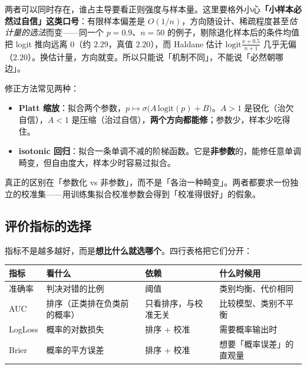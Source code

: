 \documentclass[11pt,a4paper,fontset=windows,zihao=-4]{ctexart}
\newcommand{\tabhead}{\sffamily\bfseries\color{navy}}
\begin{document}
两者可以同时存在，谁占主导要看正则强度与样本量。这里要格外小心\textbf{「小样本必然过自信」这类口号}：有限样本偏差是 $O(1/n)$，方向随设计、稀疏程度甚至\emph{估计量的选法}而变——同一个 $p=0.9$、$n=50$ 的例子，剔除退化样本后的条件均值把 logit 推向远离 $0$（约 $2.29$，真值 $2.20$），而 Haldane 估计 $\mathrm{logit}\frac{x+0.5}{n+1}$ 几乎无偏（$2.20$）。换估计量，方向就变。所以只能说「机制不同」，不能说「必然朝哪边」。

修正方法常见两种：

\begin{itemize}
  \item \textbf{Platt 缩放}：拟合两个参数，$p\mapsto\sigma\bigl(A\,\mathrm{logit}(p)+B\bigr)$。$A>1$ 是锐化（治欠自信），$A<1$ 是压缩（治过自信），\textbf{两个方向都能修}；参数少，样本少吃得住。
  \item \textbf{isotonic 回归}：拟合一条单调不减的阶梯函数。它是\textbf{非参数}的，能修任意单调畸变，但自由度大，样本少时容易过拟合。
\end{itemize}

真正的区别在「参数化 vs 非参数」，而不是「各治一种畸变」。两者都要求一份独立的校准集——用训练集拟合校准参数会得到「校准得很好」的假象。

\subsection{评价指标的选择}

指标不是越多越好，而是\textbf{想比什么就选哪个}。四行表格把它们分开：

\begin{center}
\small
\begin{tabular}{@{}lp{4.2cm}p{4.0cm}p{3.4cm}@{}}
\toprule
\rowcolor{navy!7}
\tabhead 指标 & \tabhead 看什么 & \tabhead 依赖 & \tabhead 什么时候用\\
\midrule
准确率 & 判决对错的比例 & 阈值 & 类别均衡、代价相同\\
AUC & 排序（正类排在负类前的概率） & 只看排序，与校准无关 & 比较模型、类别不平衡\\
LogLoss & 概率的对数损失 & 排序 + 校准 & 需要概率输出时\\
Brier & 概率的平方误差 & 排序 + 校准 & 想要「概率误差」的直观量\\
\bottomrule
\end{tabular}
\end{center}
\end{document}
